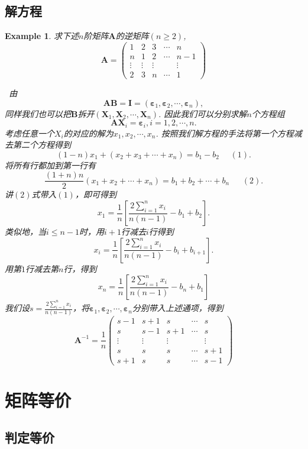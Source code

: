 \documentclass{article}
\newtheorem{example}[theorem]{Example}
\newcommand{\hints}{{\color{blue} \text{hints}}}
\newcommand{\mbf}[1]{\bm{#1}}
\begin{document}
\subsection{解方程}
\begin{example}
\rm 求下述$n$阶矩阵$\mbf{A}$的逆矩阵$(n \geq 2)$,
$$
\mbf{A} = \begin{pmatrix}
1 & 2 & 3 & \cdots & n \\
n & 1 & 2 & \cdots & n-1 \\
\vdots & \vdots & \vdots & & \vdots \\
2 & 3 & n & \cdots & 1
\end{pmatrix}
$$

\hints\ 由
$$
\mbf{A}\mbf{B} = \mbf{I} = (\mbf{\varepsilon}_1,\mbf{\varepsilon}_2,\cdots,\mbf{\varepsilon}_n),
$$
同样我们也可以把$\mbf{B}$拆开$(\mbf{X}_1,\mbf{X}_2,\cdots,\mbf{X}_n)$. 因此我们可以分别求解$n$个方程组
$$
\mbf{A}\mbf{X}_i = \mbf{\varepsilon}_i, i=1,2,\cdots,n.
$$
考虑任意一个$X_i$的对应的解为$x_1,x_2,\cdots,x_n$. 按照我们解方程的手法将第一个方程减去第二个方程得到
$$
(1-n)x_1 + (x_2+x_3+\cdots+x_n) = b_1-b_2 ~~~~~~(1).
$$
将所有行都加到第一行有
$$
\frac{(1+n)n}{2}(x_1 + x_2 + \cdots + x_n) = b_1 + b_2 + \cdots + b_n~~~~~~~(2).
$$
讲$(2)$式带入$(1)$，即可得到
$$
x_1 = \frac{1}{n}\left[\frac{2\sum\limits_{i=1}^n x_i}{n(n-1)}-b_1 + b_2 \right].
$$
类似地，当$i \leq n-1$时，用$i+1$行减去$i$行得到
$$
x_i = \frac{1}{n}\left[\frac{2\sum\limits_{i=1}^n x_i}{n(n-1)}-b_i + b_{i+1} \right].
$$
用第$1$行减去第$n$行，得到
$$
x_n =  \frac{1}{n}\left[\frac{2\sum\limits_{i=1}^n x_i}{n(n-1)}-b_n + b_{1} \right]
$$
我们设$s = \frac{2\sum\limits_{i=1}^n x_i}{n(n-1)}$，将$\mbf{\varepsilon}_1,\mbf{\varepsilon}_2,\cdots,\mbf{\varepsilon}_n$分别带入上述通项，得到
$$
\mbf{A}^{-1} = \frac{1}{n} \begin{pmatrix}
s-1 & s+1 & s & \cdots & s \\
s & s-1 & s+1 & \cdots & s \\
\vdots & \vdots & \vdots &  &\vdots \\
s & s & s & \cdots & s+1\\
s+1 & s & s & \cdots & s-1
\end{pmatrix}
$$
\end{example}

\newpage
\section{矩阵等价}

\subsection{判定等价}
\end{document}

